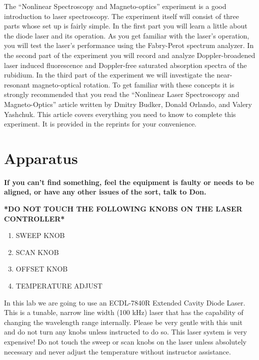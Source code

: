 \documentclass{../lab}
\begin{document}
The ``Nonlinear Spectroscopy and Magneto-optics'' experiment is a good introduction to laser spectroscopy. The experiment itself will consist of three parts whose set up is fairly simple. In the first part you will learn a little about the diode laser and its operation. As you get familiar with the laser's operation, you will test the laser's performance using the Fabry-Perot spectrum analyzer. In the second part of the experiment you will record and analyze Doppler-broadened laser induced fluorescence and Doppler-free saturated absorption spectra of the rubidium. In the third part of the experiment we will investigate the near-resonant magneto-optical rotation. To get familiar with these concepts it is strongly recommended that you read the ``Nonlinear Laser Spectroscopy and Magneto-Optics'' article written by Dmitry Budker, Donald Orlando, and Valery Yashchuk. This article covers everything you need to know to complete this experiment. It is provided in the reprints for your convenience.

\section{Apparatus}

\textbf{If you can't find something, feel the equipment is faulty or needs to be aligned, or have any other issues of the sort, talk to Don. }

\textbf{*DO NOT TOUCH THE FOLLOWING KNOBS ON THE LASER CONTROLLER*}

\begin{enumerate}
    \item SWEEP KNOB

    \item SCAN KNOB

    \item OFFSET KNOB

    \item TEMPERATURE ADJUST

\end{enumerate}

In this lab we are going to use an ECDL-7840R Extended Cavity Diode Laser. This is a tunable, narrow line width (100 kHz) laser that has the capability of changing the wavelength range internally. Please be very gentle with this unit and do not turn any knobs unless instructed to do so. This laser system is very expensive! Do not touch the sweep or scan knobs on the laser unless absolutely necessary and never adjust the temperature without instructor assistance.
\end{document}
